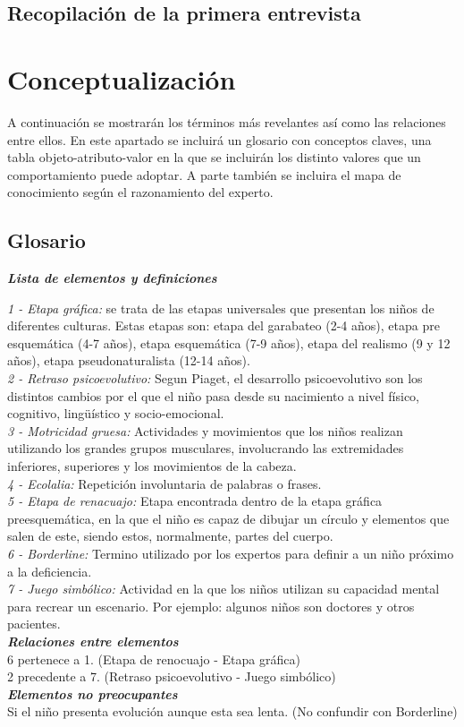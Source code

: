 \documentclass[letterpaper,12pt]{article}
\begin{document}
	\subsection{Recopilación de la primera entrevista}
\section{Conceptualización}
A continuación se mostrarán los términos más revelantes así como las
relaciones entre ellos. En este apartado se incluirá un glosario con conceptos claves, una tabla objeto-atributo-valor en la que se incluirán los distinto valores que un comportamiento puede adoptar. A parte también se incluira el mapa de conocimiento según el razonamiento del experto.
\subsection{Glosario}
\begin{flushleft}
\textbf{\textit{Lista de elementos y definiciones}}

\textit{1 - Etapa gráfica:} se trata de las etapas universales que presentan los niños de diferentes culturas. Estas etapas son: etapa del garabateo (2-4 años), etapa pre esquemática (4-7 años), etapa esquemática (7-9 años), etapa del realismo (9 y 12 años), etapa pseudonaturalista (12-14 años). \\
\textit{2 - Retraso psicoevolutivo: }Segun Piaget, el desarrollo psicoevolutivo son los distintos cambios por el que el niño pasa desde su nacimiento a nivel físico, cognitivo, lingüístico y socio-emocional. \\
\textit{3 - Motricidad gruesa:} Actividades y movimientos que los niños realizan utilizando los grandes grupos musculares, involucrando las extremidades inferiores, superiores y los movimientos de la cabeza. \\
\textit{4 - Ecolalia:} Repetición involuntaria de palabras o frases. \\
\textit{5 - Etapa de renacuajo:} Etapa encontrada dentro de la etapa gráfica preesquemática, en la que el niño es capaz de dibujar un círculo y elementos que salen de este, siendo estos, normalmente, partes del cuerpo. \\
\textit{6 - Borderline:} Termino utilizado por los expertos para definir a un niño próximo a la deficiencia.\\
\textit{7 - Juego simbólico:} Actividad en la que los niños utilizan su capacidad mental para recrear un escenario. Por ejemplo: algunos niños son doctores y otros pacientes.\\

\textbf{\textit{Relaciones entre elementos}}\\
6 pertenece a 1. (Etapa de renocuajo - Etapa gráfica) \\
2 precedente a 7. (Retraso psicoevolutivo - Juego simbólico)\\

\textbf{\textit{Elementos no preocupantes}} \\
Si el niño presenta evolución aunque esta sea lenta. (No confundir con
Borderline) \\
\end{flushleft}
\end{document}
